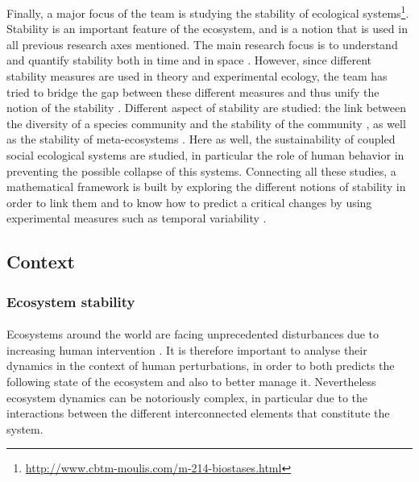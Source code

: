 \documentclass{article}
\begin{document}
Finally, a major focus of the team is studying the stability of ecological systems\footnote{\url{http://www.cbtm-moulis.com/m-214-biostases.html}}. Stability is an important feature of the ecosystem, and is a notion that is used in all previous research axes mentioned. The main research focus is to understand and quantify stability both in time and in space \citep{wang_stability_2017, zelnik_impact_2018}. However, since different stability measures are used in theory and experimental ecology, the team has tried to bridge the gap between these different measures and thus unify the notion of the stability \citep{arnold_examination_nodate}. Different aspect of stability are studied: the link between the diversity of a species community and the stability of the community \citep{vallina2017phytoplankton}, as well as the stability of meta-ecosystems \citep{arnoldi_particularity_2016, lurgi_effects_2016, wang_biodiversity_2016}.
Here as well, the sustainability of coupled social ecological systems are studied, in particular the role of human behavior in preventing the possible collapse of this systems.
Connecting all these studies, a mathematical framework is built by exploring the different notions of stability in order to link them \citep{arnoldi2016unifying, donohue_navigating_2016} and to know how to predict a critical changes by using experimental measures such as temporal variability \citep{arnoldi2016resilience, haegeman_resilience_2016, wang_invariability-area_2017}. 

\newpage


\subsection*{Context}

\subsubsection*{Ecosystem stability} %

\paragraph{}
Ecosystems around the world are facing unprecedented disturbances due to increasing human intervention \citep{oosthoek_humanity_2005}. It is therefore important to analyse  their dynamics in the context of human perturbations, in order to both predicts the following state of the ecosystem and also to better manage it.
Nevertheless ecosystem dynamics can be notoriously complex, in particular due to the interactions between the different interconnected elements that constitute the system. %
\end{document}

